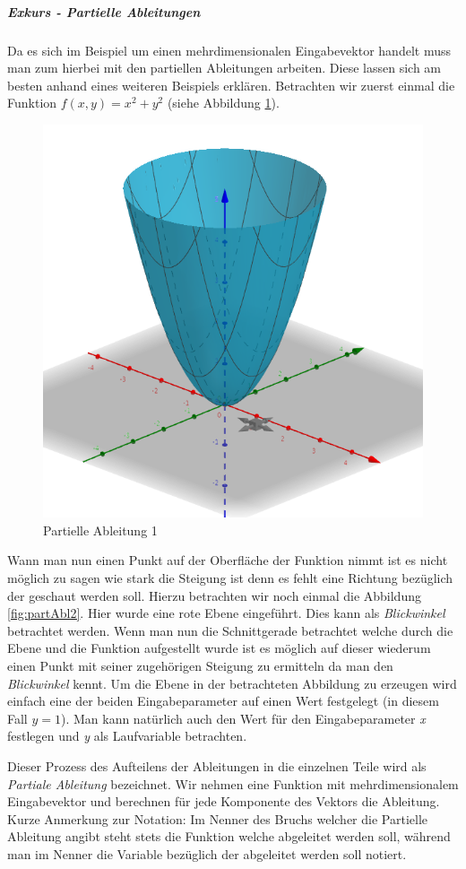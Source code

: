 \subparagraph{Exkurs - Partielle Ableitungen} \cite{partAbl}
Da es sich im Beispiel um einen mehrdimensionalen Eingabevektor handelt muss man zum hierbei mit den partiellen Ableitungen arbeiten. Diese lassen sich am besten anhand eines weiteren Beispiels erklären. Betrachten wir zuerst einmal die Funktion ${{f(x, y) = x^2 + y^2}}$ (siehe Abbildung \ref{fig:partAbl1}). 

\begin{figure}[!htb]
	\centering
	\includegraphics[width=.6\linewidth]{img/partAbl_1}
	\caption[Partielle Ableitung 1]{Partielle Ableitung 1 \protect\footnotemark}
	\label{fig:partAbl1}
\end{figure}

\FloatBarrier
{}

Wann man nun einen Punkt auf der Oberfläche der Funktion nimmt ist es nicht möglich zu sagen wie stark die Steigung ist denn es fehlt eine Richtung bezüglich der \glqq geschaut \grqq werden soll. Hierzu betrachten wir noch einmal die Abbildung \ref{fig:partAbl2}. Hier wurde eine \glqq rote Ebene \glqq eingeführt. Dies kann als \emph{Blickwinkel} betrachtet werden. Wenn man nun die Schnittgerade betrachtet welche durch die Ebene und die Funktion aufgestellt wurde ist es möglich auf dieser wiederum einen Punkt mit seiner zugehörigen Steigung zu ermitteln da man den \emph{Blickwinkel} kennt. Um die Ebene in der betrachteten Abbildung zu erzeugen wird einfach eine der beiden Eingabeparameter auf einen Wert festgelegt (in diesem Fall ${y=1}$). Man kann natürlich auch den Wert für den Eingabeparameter \emph{x} festlegen und \emph{y} als Laufvariable betrachten. 

Dieser Prozess des Aufteilens der Ableitungen in die einzelnen Teile wird als \emph{Partiale Ableitung} bezeichnet. Wir nehmen eine Funktion mit mehrdimensionalem Eingabevektor und berechnen für jede Komponente des Vektors die Ableitung. Kurze Anmerkung zur Notation: Im Nenner des Bruchs welcher die Partielle Ableitung angibt steht stets die Funktion welche abgeleitet werden soll, während man im Nenner die Variable bezüglich der abgeleitet werden soll notiert.

